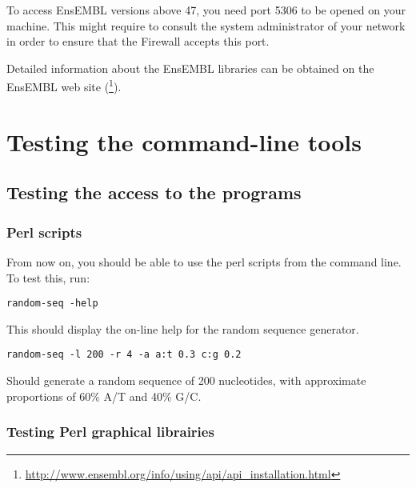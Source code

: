\documentclass[12pt,a4paper, oneside]{scrreprt} %
\begin{document}
To access EnsEMBL versions above 47, you need port 5306 to be opened
on your machine. This might require to consult the system
administrator of your network in order to ensure that the Firewall
accepts this port.

Detailed information about the EnsEMBL libraries can be obtained on
the EnsEMBL web site
(\footnote{\url{http://www.ensembl.org/info/using/api/api\_installation.html}}).








\chapter{Testing the command-line tools}

\section{Testing the access to the programs}

\subsection{Perl scripts}

From now on, you should be able to use the perl scripts from the
command line. To test this, run:

\begin{lstlisting}
random-seq -help
\end{lstlisting}


This should display the on-line help for the random sequence
generator.

\begin{lstlisting}
random-seq -l 200 -r 4 -a a:t 0.3 c:g 0.2
\end{lstlisting}

Should generate a random sequence of 200 nucleotides, with approximate
proportions of 60\% A/T and 40\% G/C.


\subsection{Testing Perl graphical librairies}
\end{document}
